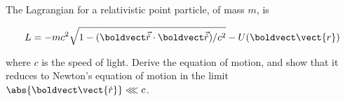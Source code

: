 \documentclass[../main.tex]{subfiles}
\begin{document}
\begin{problema}
	The Lagrangian for a relativistic point particle, of mass \(m\), is

	\begin{equation*}
		L = -mc^{2}\sqrt{1 - (\boldvect\vec{\dot{r}}\cdot \boldvect\vec{\dot{r}})/c^{2}} - U(\boldvect\vect{r})
	\end{equation*}

	where \(c\) is the speed of light. Derive the equation of motion, and
	show that it reduces to Newton's equation of motion in the limit
	\( \abs{\boldvect\vect{\dot{r}}} \lll c\).
\end{problema}
\end{document}
